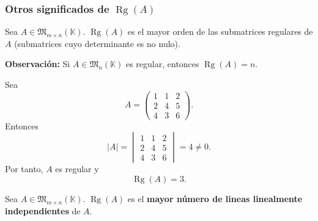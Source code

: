 \documentclass[a4paper,12pt]{article}
\begin{document}
\subsubsection{Otros significados de $\operatorname{Rg}(A)$}

\begin{procedimiento}[title=Rango como mayor orden de submatrices regulares]
Sea $A \in \mathfrak{M}_{m \times n}(\mathbb{K})$.  
$\operatorname{Rg}(A)$ es el mayor orden de las submatrices regulares de $A$ (submatrices cuyo determinante es no nulo).

\medskip
\textbf{Observación:}  
Si $A \in \mathfrak{M}_n(\mathbb{K})$ es regular, entonces $\operatorname{Rg}(A) = n$.

\end{procedimiento}

\begin{ejemplo}
Sea
\[
A =
\begin{pmatrix}
1 & 1 & 2 \\
2 & 4 & 5 \\
4 & 3 & 6
\end{pmatrix}.
\]
Entonces
\[
|A| =
\begin{vmatrix}
1 & 1 & 2 \\
2 & 4 & 5 \\
4 & 3 & 6
\end{vmatrix}
= 4 \neq 0.
\]
Por tanto, $A$ es regular y
\[
\operatorname{Rg}(A)=3.
\]
\end{ejemplo}

\begin{procedimiento}[title=Rango como mayor número de líneas linealmente independientes]
Sea $A \in \mathfrak{M}_{m \times n}(\mathbb{K})$. $\operatorname{Rg}(A)$ es el \textbf{mayor número de lineas linealmente independientes} de $A$.

\end{procedimiento}
\end{document}
